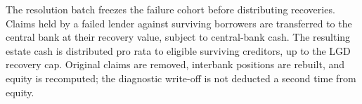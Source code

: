 

The resolution batch freezes the failure cohort before distributing
recoveries. Claims held by a failed lender against surviving borrowers
are transferred to the central bank at their recovery value, subject to
central-bank cash. The resulting estate cash is distributed pro rata to
eligible surviving creditors, up to the LGD recovery cap. Original claims
are removed, interbank positions are rebuilt, and equity is recomputed;
the diagnostic write-off is not deducted a second time from equity.




